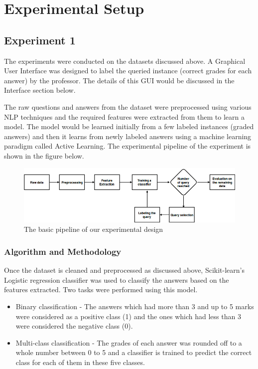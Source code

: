 \section{Experimental Setup}

\subsection{Experiment 1}

The experiments were conducted on the datasets discussed above. A Graphical User Interface was designed to label the queried instance (correct grades for each answer) by the professor. The details of this GUI would be discussed in the Interface section below. 

The raw questions and answers from the dataset were preprocessed using various NLP techniques and the required features were extracted from them to learn a model. The model would be learned initially from a few labeled instances (graded answers) and then it learns from newly labeled answers using a machine learning paradigm called Active Learning. The experimental pipeline of the experiment is shown in the figure below.

\begin{figure}[h]
	\centering
	\includegraphics[scale=0.5]{images/exp_design}
	\caption{The basic pipeline of our experimental design}
	\label{exp_pipeline}
\end{figure}

\subsubsection{Algorithm and Methodology}

Once the dataset is cleaned and preprocessed as discussed above, Scikit-learn's Logistic regression classifier was used to classify the answers based on the features extracted. Two tasks were performed using this model. 

\begin{itemize}
	\item Binary classification - The answers which had more than 3 and up to 5 marks were considered as a positive class (1) and the ones which had less than 3 were considered the negative class (0). 
	
	\item Multi-class classification - The grades of each answer was rounded off to a whole number between 0 to 5 and a classifier is trained to predict the correct class for each of them in these five classes. 
\end{itemize}


